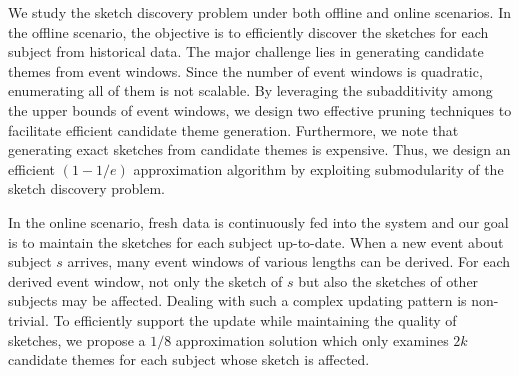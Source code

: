 

%


We study the sketch discovery problem under both offline and online scenarios. 
In the offline scenario, the objective is to efficiently discover the sketches for each subject 
from historical data. 
The major challenge lies in generating
candidate themes from event windows. Since the number of event windows is quadratic, enumerating 
all of them is not scalable. By leveraging the subadditivity among the upper bounds of event windows, we design two effective pruning techniques to facilitate efficient candidate theme generation.
Furthermore, we note that generating exact sketches from candidate themes is expensive. Thus, we design an efficient $(1-1/e)$ approximation algorithm by exploiting submodularity of the sketch discovery problem.

In the online scenario, fresh data is continuously fed into the system and our goal is to maintain the sketches for each subject up-to-date. When a new event about subject $s$ arrives, many event windows of various lengths can be derived. For each derived event window,
not only the sketch of $s$ but also the sketches
of other subjects may be affected. Dealing with such a complex updating pattern is non-trivial. 
To efficiently support the update while maintaining the quality of sketches, we propose a $1/8$ approximation solution which only   
examines $2k$ candidate themes for each subject whose sketch is affected. 





